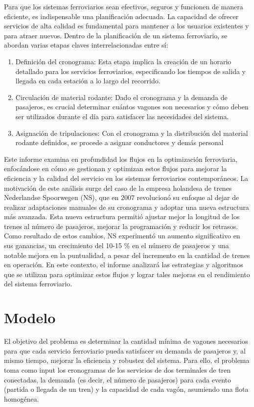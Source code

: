 \documentclass{article}
\begin{document}
    Para que los sistemas ferroviarios sean efectivos, seguros y funcionen de manera eficiente, es indispensable una planificación adecuada. La capacidad de ofrecer servicios de alta calidad es fundamental para mantener a los usuarios existentes y para atraer nuevos. Dentro de la planificación de un sistema ferroviario, se abordan varias etapas claves interrelacionadas entre sí:
    \begin{enumerate}
            \item Definición del cronograma: Esta etapa implica la creación de un horario detallado para los servicios ferroviarios, especificando los tiempos de salida y llegada en cada estación a lo largo del recorrido. 
            \item Circulación de material rodante: Dado el cronograma y la demanda de pasajeros, es crucial determinar cuántos vagones son necesarios y cómo deben ser utilizados durante el día para satisfacer las necesidades del sistema.
            \item Asignación de tripulaciones: Con el cronograma y la distribución del material rodante definidos, se procede a asignar conductores y demás personal
        \end{enumerate}

    Este informe examina en profundidad los flujos en la optimización ferroviaria, enfocándose en cómo se gestionan y optimizan estos flujos para mejorar la eficiencia y la calidad del servicio en los sistemas ferroviarios contemporáneos. La motivación de este análisis surge del caso de la empresa holandesa de trenes Nederlandse Spoorwegen (NS), que en 2007 revolucionó su enfoque al dejar de realizar adaptaciones manuales de su cronograma y adoptar una nueva estructura más avanzada. Esta nueva estructura permitió ajustar mejor la longitud de los trenes al número de pasajeros, mejorar la programación y reducir los retrasos. Como resultado de estos cambios, NS experimentó un aumento significativo en sus ganancias, un crecimiento del 10-15 \% en el número de pasajeros y una notable mejora en la puntualidad, a pesar del incremento en la cantidad de trenes en operación. En este contexto, el informe analizará las estrategias y algoritmos que se utilizan para optimizar estos flujos y lograr tales mejoras en el rendimiento del sistema ferroviario.
    \\
 
\section{Modelo}
    \vspace{0.5cm}
    El objetivo del problema es determinar la cantidad mínima de vagones necesarios para que cada servicio ferroviario pueda satisfacer su demanda de pasajeros y, al mismo tiempo, mejorar la eficiencia y robustez del sistema. Para ello, el problema toma como input los cronogramas de los servicios de dos terminales de tren conectadas, la demanda (es decir, el número de pasajeros) para cada evento (partida o llegada de un tren) y la capacidad de cada vagón, asumiendo una flota homogénea.
    
\end{document}
